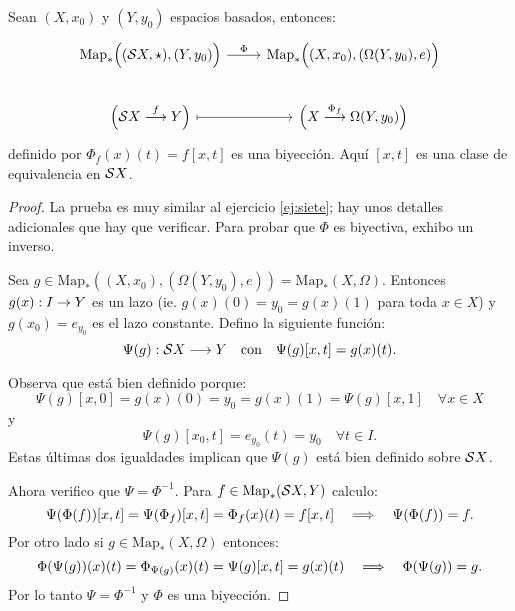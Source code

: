 
\begin{ejercicio}\label{ej:ocho}
Sean $(X,x_0)$ y $(Y,y_0)$ espacios basados, entonces:
\[
\begin{tikzcd}
	\text{Map}_*\Big((\Ss X,\star),(Y,y_0)\Big) \arrow[r,"\Phi"] &
	\text{Map}_*\Big((X,x_0),(\Omega(Y,y_0),e)\Big) \\
	\Big( \Ss X \morf{f} Y \Big) \arrow[r,mapsto] &
	\Big( X \morf{\Phi_f} \Omega(Y,y_0) \Big)
\end{tikzcd}
\]
definido por $\Phi_f(x)(t)=f[x,t]$ es una biyecci\'on. Aqu\'i $[x,t]$ es una clase de equivalencia
en $\mathcal{S} X$. 
\end{ejercicio}

\begin{proof}%

La prueba es muy similar al ejercicio \ref{ej:siete}; hay unos detalles adicionales que hay
que verificar. Para probar que $\Phi$ es biyectiva, exhibo un inverso.

Sea $g\in\text{Map}_*((X,x_0),(\Omega(Y,y_0),e))=\text{Map}_*(X,\Omega)$. Entonces $g(x):I\rightarrow Y$
es un lazo (ie. $g(x)(0)=y_0=g(x)(1)$ para toda $x\in X$) y $g(x_0)=e_{y_0}$ es el lazo constante.
Defino la siguiente funci\'on:
\[
	\Psi(g):\mathcal{S} X \longrightarrow Y \quad\text{con}\quad \Psi(g)[x,t]=g(x)(t).
\]

Observa que est\'a bien definido porque:
\[
	\Psi(g)[x,0]=g(x)(0)=y_0=g(x)(1)=\Psi(g)[x,1] \quad\forall x\in X
\]
y
\[
	\Psi(g)[x_0,t]=e_{y_0}(t)=y_0 \quad\forall t\in I.
\]
Estas \'ultimas dos igualdades implican que $\Psi(g)$ est\'a bien definido sobre $\mathcal{S} X$.

Ahora verifico que $\Psi=\Phi^{-1}$. Para $f\in\text{Map}_*(\mathcal{S} X,Y)$ calculo:
\[
	\Psi(\Phi(f))[x,t]=\Psi(\Phi_f)[x,t]=\Phi_f(x)(t)=f[x,t] \quad\Longrightarrow\quad
	\Psi(\Phi(f))=f.
\]
Por otro lado si $g\in\text{Map}_*(X,\Omega)$ entonces:
\[
	\Phi(\Psi(g))(x)(t)=\Phi_{\Psi(g)}(x)(t)=\Psi(g)[x,t]=g(x)(t) \quad\Longrightarrow\quad
	\Phi(\Psi(g))=g.
\]
Por lo tanto $\Psi=\Phi^{-1}$ y $\Phi$ es una biyecci\'on.

\end{proof}%

